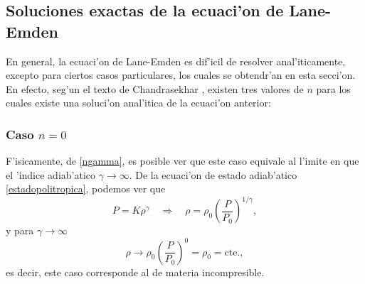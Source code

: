 
\subsection{Soluciones exactas de la ecuaci'on de Lane-Emden}\label{sec:exactas}
En general, la ecuaci'on de Lane-Emden es dif'icil de resolver anal'iticamente, excepto para ciertos casos particulares, los cuales se obtendr'an en esta secci'on. En efecto, seg'un el texto de Chandrasekhar \cite{Chandra39}, existen tres valores de $n$ para los cuales existe una soluci'on anal'itica de la ecuaci'on anterior:

\subsubsection{Caso \texorpdfstring{$n=0$}{n0}}

F'isicamente, de \eqref{ngamma}, es posible ver que este caso equivale al l'imite en que el 'indice adiab'atico $\gamma\to\infty$. De la ecuaci'on de estado adiab'atico \eqref{estadopolitropica}, podemos ver que
\begin{equation}
 P=K\rho^{\gamma}\quad\Rightarrow\quad \rho=\rho_0\left(\frac{P}{P_0}\right)^{1/\gamma},
\end{equation}
y para $\gamma\to\infty$
\begin{equation}
 \rho\to\rho_0\left(\frac{P}{P_0}\right)^{0}=\rho_0=\text{cte.},
\end{equation}
es decir, este caso corresponde al de materia incompresible.


